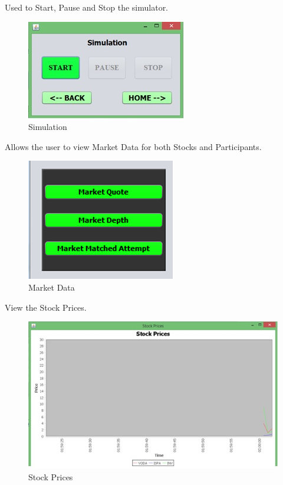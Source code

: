 \documentclass[12pt]{article}
\begin{document}
    Used to Start, Pause and Stop the simulator.

\pagebreak            
\begin{figure}[h!]
\centering
\includegraphics[scale=0.8]{./simulation}
\caption{Simulation}
\label{Simulation}
\end{figure}

Allows the user to view Market Data for both Stocks and Participants.

\begin{figure}[h!]
\centering
\includegraphics[scale=0.8]{./marketdata}
\caption{Market Data}
\label{Market Data}
\end{figure}
        
        View the Stock Prices.

	\begin{figure}[h!]
	\centering
	\includegraphics[scale=0.8]{./stockprices}
	\caption{Stock Prices}
	\label{Stock Prices}
	\end{figure}
	
\end{document}
